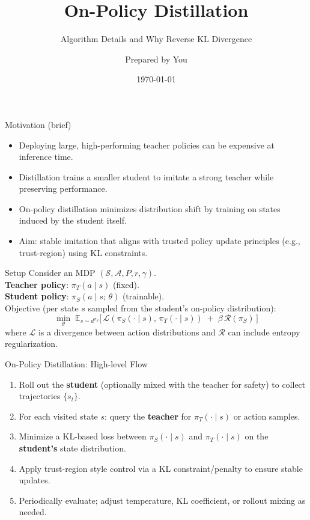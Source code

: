 \documentclass[10pt,aspectratio=169]{beamer}
\title{On-Policy Distillation}
\subtitle{Algorithm Details and Why Reverse KL Divergence}
\author{Prepared by You}
\institute{Study Notes}
\date{\today}
\begin{document}
\begin{frame}
  \titlepage
\end{frame}

\begin{frame}{Motivation (brief)}
  \begin{itemize}
    \item Deploying large, high-performing teacher policies can be expensive at inference time.
    \item Distillation trains a smaller student to imitate a strong teacher while preserving performance.
    \item On-policy distillation minimizes distribution shift by training on states induced by the student itself.
    \item Aim: stable imitation that aligns with trusted policy update principles (e.g., trust-region) using KL constraints.
  \end{itemize}
\end{frame}

\begin{frame}{Setup}
  Consider an MDP $(\mathcal{S}, \mathcal{A}, P, r, \gamma)$.\\[2mm]
  \textbf{Teacher policy}: $\pi_T(a\mid s)$ (fixed).\\
  \textbf{Student policy}: $\pi_S(a\mid s;\,\theta)$ (trainable).\\[2mm]
  Objective (per state $s$ sampled from the student's on-policy distribution):
  \[
    \min_{\theta} \; \mathbb{E}_{s \sim d^{\pi_S}}\big[\, \mathcal{L}(\pi_S(\cdot\mid s),\,\pi_T(\cdot\mid s)) 
    \; + \; \beta\, \mathcal{R}(\pi_S) \,\big]
  \]
  where $\mathcal{L}$ is a divergence between action distributions and $\mathcal{R}$ can include entropy regularization.
\end{frame}

\begin{frame}{On-Policy Distillation: High-level Flow}
  \begin{enumerate}
    \item Roll out the \textbf{student} (optionally mixed with the teacher for safety) to collect trajectories $\{s_t\}$.
    \item For each visited state $s$: query the \textbf{teacher} for $\pi_T(\cdot\mid s)$ or action samples.
    \item Minimize a KL-based loss between $\pi_S(\cdot\mid s)$ and $\pi_T(\cdot\mid s)$ on the \textbf{student's} state distribution.
    \item Apply trust-region style control via a KL constraint/penalty to ensure stable updates.
    \item Periodically evaluate; adjust temperature, KL coefficient, or rollout mixing as needed.
  \end{enumerate}
\end{frame}
\end{document}
